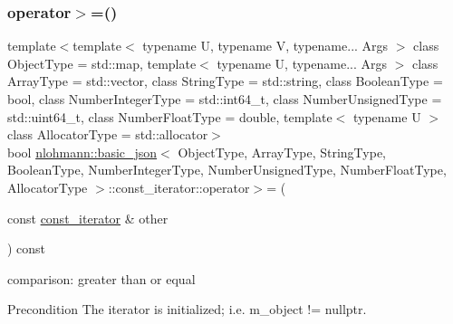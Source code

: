 \subsubsection{\texorpdfstring{operator$>$=()}{operator>=()}}
{\footnotesize\ttfamily template$<$template$<$ typename U, typename V, typename... Args $>$ class Object\+Type = std\+::map, template$<$ typename U, typename... Args $>$ class Array\+Type = std\+::vector, class String\+Type  = std\+::string, class Boolean\+Type  = bool, class Number\+Integer\+Type  = std\+::int64\+\_\+t, class Number\+Unsigned\+Type  = std\+::uint64\+\_\+t, class Number\+Float\+Type  = double, template$<$ typename U $>$ class Allocator\+Type = std\+::allocator$>$ \\
bool \hyperlink{classnlohmann_1_1basic__json}{nlohmann\+::basic\+\_\+json}$<$ Object\+Type, Array\+Type, String\+Type, Boolean\+Type, Number\+Integer\+Type, Number\+Unsigned\+Type, Number\+Float\+Type, Allocator\+Type $>$\+::const\+\_\+iterator\+::operator$>$= (\begin{DoxyParamCaption}\item[{const \hyperlink{classnlohmann_1_1basic__json_1_1const__iterator}{const\+\_\+iterator} \&}]{other }\end{DoxyParamCaption}) const\hspace{0.3cm}{\ttfamily [inline]}}



comparison\+: greater than or equal 

\begin{DoxyPrecond}{Precondition}
The iterator is initialized; i.\+e. {\ttfamily m\+\_\+object != nullptr}. 
\end{DoxyPrecond}
\hypertarget{classnlohmann_1_1basic__json_1_1const__iterator_a70caca372e345c9c700ab849c3d9463b}{}\label{classnlohmann_1_1basic__json_1_1const__iterator_a70caca372e345c9c700ab849c3d9463b} 
